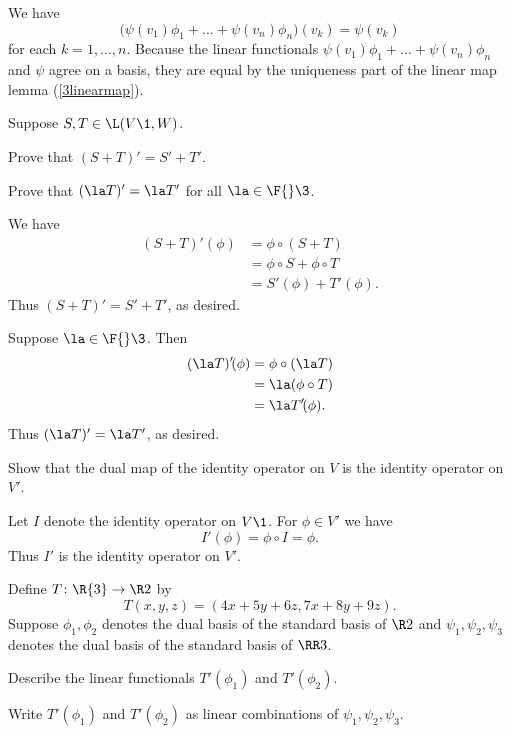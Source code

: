 \begin{Solution}
We have
\[
\bigl( \psi(v_1) \phi_1 + \dots + \psi(v_n) \phi_n\bigr)(v_k) = \psi(v_k)
\]
for each $k = 1, \dots, n$. Because the linear functionals $ \psi(v_1) \phi_1 + \dots + \psi(v_n) \phi_n$ and $\psi$ agree on a basis, they are equal by the uniqueness part of the linear map lemma (\ref{3linearmap}).
\end{Solution}

\exercise
Suppose $S, T \in \L(V\1, W)$.
\begin{subtheorem}
\item
Prove that $(S + T)' = S' + T'\!$.
\item
Prove that $(\la T)' = \la T'$ for all $\la \in \F{}\3$.
\end{subtheorem}

\begin{Solution}
\begin{subtheorem}
\item
We have
\begin{align*}
(S + T)' \! (\phi) &= \phi \circ (S + T) \\
&= \phi \circ S + \phi \circ T \\
&= S' \! (\phi) + T' \! (\phi).
\end{align*}
Thus $(S+T)' = S' + T'$, as desired.

\item
Suppose $\la \in \F{}\3$. Then
\begin{align*}
(\la T)' \! (\phi) &= \phi \circ (\la T) \\
&= \la (\phi \circ T) \\
&= \la T' \! (\phi).
\end{align*}
Thus $(\la T)' = \la T'$, as desired.
\end{subtheorem}
\end{Solution}

\exercise
Show that the dual map of the identity operator on $V$ is the identity operator on~$V'\!$.

\begin{Solution}
Let $I$ denote the identity operator on $V\1$. For $\phi \in V'$ we have
\[
I' \! (\phi) = \phi \circ I = \phi.
\]
Thus $I'$ is the identity operator on $V'\!$.
\end{Solution}

\exercise
Define $T \colon \R{3} \to \R2$ by
\[
T(x, y, z) = (4x + 5y + 6z, 7x + 8y + 9z).
\]
Suppose $\phi_1, \phi_2$ denotes the dual basis of the standard basis of $\R2$ and $\psi_1, \psi_2, \psi_3$ denotes the dual basis of the standard basis of $\RR3$.
\begin{subtheorem}
\item
Describe the linear functionals $T' \! (\phi_1)$ and $T' \! (\phi_2)$.
\item
Write $T' \! (\phi_1)$ and $T' \! (\phi_2)$ as linear combinations of $\psi_1, \psi_2, \psi_3$.
\end{subtheorem}
\exercisesubtheoremend

